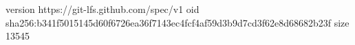 version https://git-lfs.github.com/spec/v1
oid sha256:b341f5015145d60f6726ea36f7143ec4fcf4af59d3b9d7cd3f62e8d68682b23f
size 13545
